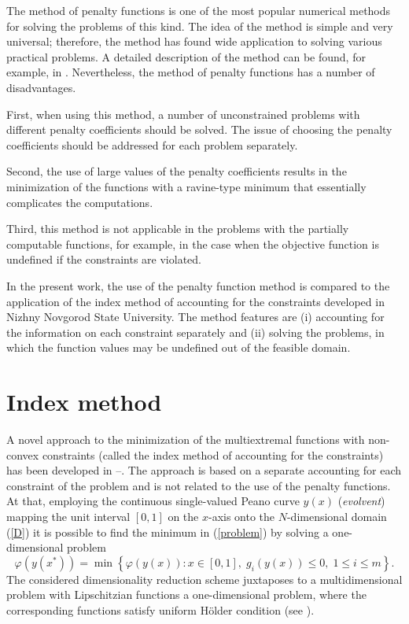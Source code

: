 \documentclass{llncs}
\begin{document}
The method of penalty functions is one of the most popular numerical methods for solving the problems of this kind. The idea of the method is simple and very universal; therefore, the method has found wide application to solving various practical problems. A detailed description of the method can be found, for example, in \cite{Bazaraa}. Nevertheless, the method of penalty functions has a number of disadvantages. 

First, when using this method, a number of unconstrained problems with different penalty coefficients should be solved. The issue of choosing the penalty coefficients should be addressed for each problem separately.

Second, the use of large values of the penalty coefficients results in the minimization of the functions with a ravine-type minimum that essentially complicates the computations.

Third, this method is not applicable in the problems with the partially computable functions, for example, in the case when the objective function is undefined if the constraints are violated.

In the present work, the use of the penalty function method is compared to the application of the index method of accounting for the constraints developed in Nizhny Novgorod State University. The method features are (i) accounting for the information on each constraint separately and (ii) solving the problems, in which the function values may be undefined out of the feasible domain.

\section{Index method}

A novel approach to the minimization of the multiextremal functions with non-convex constraints (called the index method of accounting for the constraints) has been developed in \cite{Strongin2000}--\cite{Strongin2003}. The approach is based on a separate accounting for each constraint of the problem and is not related to the use of the penalty functions. 
At that, employing the continuous single-valued Peano curve $y(x)$ (\textit{evolvent}) mapping the unit interval $[0,1]$ on the $x$-axis onto the $N$-dimensional domain (\ref{D}) it is possible to find the minimum in (\ref{problem}) by solving a one-dimensional problem
\[
\varphi(y(x^\ast))=\min \left\{\varphi(y(x)): x \in [0,1], \; g_i(y(x))\leq 0, \; 1 \leq i \leq m\right\}.
\]
The considered dimensionality reduction scheme juxtaposes to a multidimensional problem with Lipschitzian functions a one-dimensional problem, where the corresponding functions satisfy uniform H{\"o}lder condition (see \cite{Strongin2000}).
\end{document}
